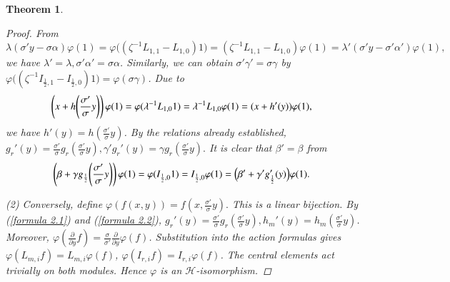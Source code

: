 \documentclass[12pt,reqno]{amsart}
\numberwithin{equation}{section}
\newtheorem{theo}{Theorem}[section]
\begin{document}
\begin{theo}
\begin{proof}
From  $\lambda(\sigma'y-\sigma\alpha)\varphi(1)=\varphi\bigl((\zeta^{-1}L_{1,1}-L_{1,0})1\bigr)
=(\zeta^{-1}L_{1,1}-L_{1,0})\varphi(1)=\lambda'(\sigma'y-\sigma'\alpha')\varphi(1),$
we have $\lambda'=\lambda,\sigma'\alpha'=\sigma\alpha$.
Similarly, we can obtain $\sigma'\gamma'=\sigma\gamma$ by $\varphi\Big((\zeta^{-1}I_{\frac12,1}-I_{\frac12,0})1\Big)=\varphi(\sigma\gamma)$. 
Due to 
\begin{equation*}
\aligned
&\left(x+h\!\left(\frac{\sigma'}{\sigma}y\right)\right)\varphi(1)=\varphi(\lambda^{-1}L_{1,0}1)
=\lambda^{-1}L_{1,0}\varphi(1)
=(x+h'(y))\varphi(1),
\endaligned
\end{equation*}
we have 
$h'(y)=h\!\left(\frac{\sigma'}{\sigma}y\right)$.
By the relations already established,
$g_r'(y)=\frac{\sigma'}{\sigma}
g_r\!\left(\frac{\sigma'}{\sigma}y\right),
\gamma'g_r'(y)=\gamma g_r\!\left(\frac{\sigma'}{\sigma}y\right).$
It is clear that $\beta'=\beta$ from
\begin{equation*}
\aligned
&\left(\beta+\gamma g_{\frac12}
\!\left(\frac{\sigma'}{\sigma}y\right)\right)\varphi(1)=\varphi(I_{\frac12,0}1)
=I_{\frac12,0}\varphi(1)
=\Big(\beta'+\gamma'g_{\frac12}'(y)\Big)\varphi(1).
\endaligned
\end{equation*}



\rm(2)  
Conversely, define
$\varphi(f(x,y))=f\!\left(x,\frac{\sigma'}{\sigma}y\right).$
This is a linear bijection. By (\ref{formula 2.1}) and (\ref{formula 2.2}),
$g_r'(y)=\frac{\sigma'}{\sigma}
g_r\!\left(\frac{\sigma'}{\sigma}y\right),
h_m'(y)=h_m\!\left(\frac{\sigma'}{\sigma}y\right)$.
Moreover,
$\varphi\!\left(\frac{\partial }{\partial y}f\right)
=\frac{\sigma}{\sigma'}
\frac{\partial}{\partial y}\varphi(f)$.
Substitution into the action formulas gives
$\varphi(L_{m,i}f)=L_{m,i}\varphi(f)$,
$\varphi(I_{r,i}f)=I_{r,i}\varphi(f)$.
The central elements act trivially on both modules. Hence $\varphi$ is an $\mathcal H$-isomorphism.
\end{proof}

 
















 
 











\end{theo}
\end{document}

